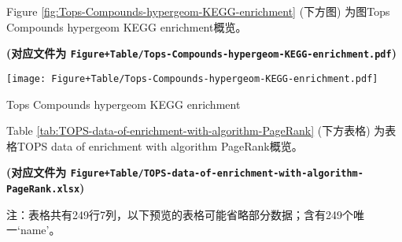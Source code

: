 \documentclass[
]{article}
\begin{document}
\begin{center}\vspace{1.5cm}\end{center}

\begin{center}\vspace{1.5cm}\end{center}

Figure \ref{fig:Tops-Compounds-hypergeom-KEGG-enrichment} (下方图) 为图Tops Compounds hypergeom KEGG enrichment概览。

\textbf{(对应文件为 \texttt{Figure+Table/Tops-Compounds-hypergeom-KEGG-enrichment.pdf})}

\def\@captype{figure}
\begin{center}
\texttt{[image: Figure+Table/Tops-Compounds-hypergeom-KEGG-enrichment.pdf]}
\caption{Tops Compounds hypergeom KEGG enrichment}\label{fig:Tops-Compounds-hypergeom-KEGG-enrichment}
\end{center}

\begin{center}\vspace{1.5cm}\end{center}

\begin{center}\vspace{1.5cm}\end{center}

Table \ref{tab:TOPS-data-of-enrichment-with-algorithm-PageRank} (下方表格) 为表格TOPS data of enrichment with algorithm PageRank概览。

\textbf{(对应文件为 \texttt{Figure+Table/TOPS-data-of-enrichment-with-algorithm-PageRank.xlsx})}

\begin{center}\begin{tcolorbox}[colback=gray!10, colframe=gray!50, width=0.9\linewidth, arc=1mm, boxrule=0.5pt]注：表格共有249行7列，以下预览的表格可能省略部分数据；含有249个唯一`name'。
\end{tcolorbox}
\end{center}
\end{document}
